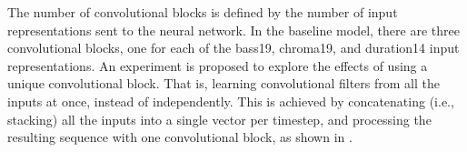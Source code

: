
The number of convolutional blocks is defined by the number
of input representations sent to the neural network. In the
baseline model, there are three convolutional blocks, one
for each of the \gls{bass19}, \gls{chroma19}, and
\gls{duration14} input representations. An experiment is
proposed to explore the effects of using a unique
convolutional block. That is, learning convolutional filters
from all the inputs at once, instead of independently. This
is achieved by concatenating (i.e., stacking) all the inputs
into a single vector per timestep, and processing the
resulting sequence with one convolutional block, as shown in
.

